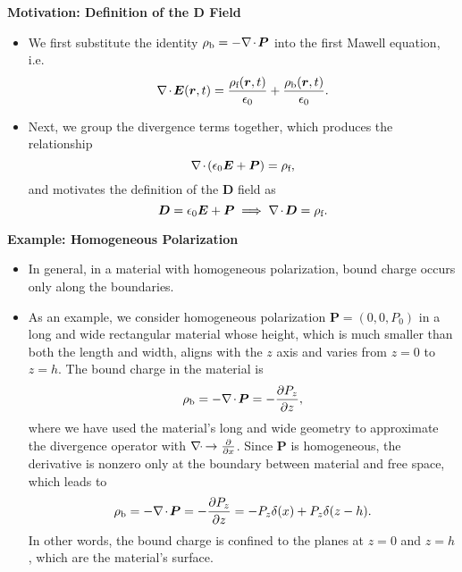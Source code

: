 \documentclass[11pt, a4paper]{article}
\renewcommand{\vec}[1]{\bm{#1}} %
\renewcommand{\r}{\vec{r}}
\newcommand{\E}{\vec{E}} %
\newcommand{\D}{\vec{D}}  %
\renewcommand{\P}{\vec{P}}  %
\newcommand{\ee}{\epsilon_{0}}  %
\renewcommand{\div}{\nabla \mspace{-2mu} \cdot \mspace{-2mu}}
\begin{document}
\textbf{Motivation: Definition of the $ \D $ Field}
\begin{itemize}
        \item We first substitute the identity $ \rho_{\text{b}} = - \div \P $ into the first Mawell equation, i.e.
    \begin{equation*}
		\div \E (\r, t) = \frac{\rho_{\text{f}}(\r, t)}{\ee} + \frac{\rho_{\text{b}}(\r, t)}{\ee}.
    \end{equation*}
    
    \item Next, we group the divergence terms together, which produces the relationship
	\begin{equation*}
		\div (\ee \E + \P) = \rho_{\text{f}},
	\end{equation*}
    and motivates the definition of the $ \D $ field as
	\begin{equation*}
		\D = \ee \E + \P \implies \div \D = \rho_{\text{f}}.
	\end{equation*}

\end{itemize}
	
\textbf{Example: Homogeneous Polarization}
\begin{itemize}
    \item In general, in a material with homogeneous polarization, bound charge occurs only along the boundaries.

	\item As an example, we consider homogeneous polarization $ \P = (0, 0, P_{0}) $ in a long and wide rectangular material whose height, which is much smaller than both the length and width, aligns with the $ z $ axis and varies from $ z = 0 $ to $ z = h $. The bound charge in the material is
	\begin{equation*}
		\rho_{\text{b}} = - \div \P = - \pdv{P_{z}}{z},
	\end{equation*}
    where we have used the material's long and wide geometry to approximate the divergence operator with $ \div \to \pdv{x} $. Since $ \P $ is homogeneous, the derivative is nonzero only at the boundary between material and free space, which leads to
	\begin{equation*}
		\rho_{\text{b}} = - \div \P = - \pdv{P_{z}}{z} = - P_{z}\delta(x) + P_{z}\delta(z - h).
	\end{equation*}
	In other words, the bound charge is confined to the planes at $ z = 0 $ and $ z = h $, which are the material's surface. 

\end{itemize}
\end{document}
